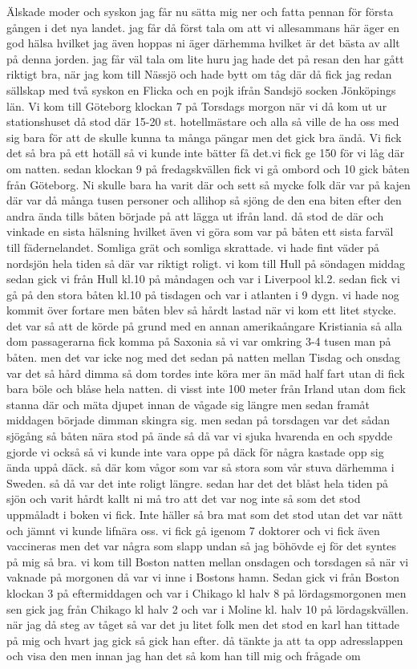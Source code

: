 \noindent Älskade moder och syskon jag får nu sätta mig ner och fatta pennan för första gången i det nya landet. jag får då först tala om att vi allesammans här äger en god hälsa hvilket jag även hoppas ni äger därhemma hvilket är det bästa av allt på denna jorden. jag får väl tala om lite huru jag hade det på resan den har gått riktigt bra, när jag kom till Nässjö och hade bytt om tåg där då fick jag redan sällskap med två syskon en Flicka och en pojk ifrån Sandsjö socken Jönköpings län. Vi kom till Göteborg klockan 7 på Torsdags morgon när vi då kom ut ur stationshuset då stod där 15-20 st. hotellmästare och alla så ville de ha oss med sig bara för att de skulle kunna ta många pängar men det gick bra ändå. Vi fick det så bra på ett hotäll så vi kunde inte bätter få det.vi fick ge 150 för vi låg där om natten. sedan klockan 9 på fredagskvällen fick vi gå ombord och 10 gick båten från Göteborg. Ni skulle bara ha varit där och sett så mycke folk där var på kajen där var då många tusen personer och allihop så sjöng de den ena biten efter den andra ända tills båten började på att lägga ut ifrån land. då stod de där och vinkade en sista hälsning hvilket även vi göra som var på båten ett sista farväl till fädernelandet. Somliga grät och somliga skrattade. vi hade fint väder på nordsjön hela tiden så där var riktigt roligt. vi kom till Hull på söndagen middag sedan gick vi från Hull kl.10 på måndagen och var i Liverpool kl.2. sedan fick vi gå på den stora båten kl.10 på tisdagen och var i atlanten i 9 dygn. vi hade nog kommit över fortare men båten blev så hårdt lastad när vi kom ett litet stycke. det var så att de körde på grund med en annan amerikaångare Kristiania så alla dom passagerarna fick komma på Saxonia så vi var omkring 3-4 tusen man på båten. men det var icke nog med det sedan på natten mellan Tisdag och onsdag var det så hård dimma så dom tordes inte köra mer än mäd half fart utan di fick bara böle och blåse hela natten. di visst inte 100 meter från Irland utan dom fick stanna där och mäta djupet innan de vågade sig längre men sedan framåt middagen började dimman skingra sig. men sedan på torsdagen var det sådan sjögång så båten nära stod på ände så då var vi sjuka hvarenda en och spydde gjorde vi också så vi kunde inte vara oppe på däck för några kastade opp sig ända uppå däck. så där kom vågor som var så stora som vår stuva därhemma i Sweden. så då var det inte roligt längre. sedan har det det blåst hela tiden på sjön och varit hårdt kallt ni må tro att det var nog inte så som det stod uppmåladt i boken vi fick. Inte häller så bra mat som det stod utan det var nätt och jämnt vi kunde lifnära oss. vi  fick gå igenom 7 doktorer och vi fick även vaccineras men det var några som slapp undan så jag böhövde ej för det syntes på mig så bra. vi kom till Boston natten mellan onsdagen och torsdagen så när vi vaknade på morgonen då var vi inne i Bostons hamn. Sedan gick vi från Boston klockan 3 på eftermiddagen och var i Chikago kl halv 8 på lördagsmorgonen men sen gick jag från Chikago kl halv 2 och var i Moline kl. halv 10 på lördagskvällen. när  jag då steg av tåget så var det ju litet folk men det stod en karl han tittade på mig och hvart jag gick så gick han efter. då tänkte ja att ta opp adresslappen och visa den men innan jag han det så kom han till mig och frågade om 